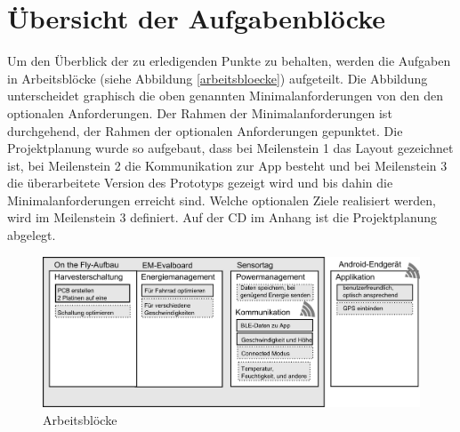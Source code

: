 \section{Übersicht der Aufgabenblöcke}

Um den Überblick der zu erledigenden Punkte zu behalten, werden die Aufgaben in Arbeitsblöcke (siehe Abbildung \ref{arbeitsbloecke}) aufgeteilt. Die Abbildung unterscheidet graphisch die oben genannten Minimalanforderungen von den den optionalen Anforderungen. Der Rahmen der Minimalanforderungen ist durchgehend, der Rahmen der optionalen Anforderungen gepunktet. Die Projektplanung wurde so aufgebaut, dass bei Meilenstein 1 das Layout gezeichnet ist, bei Meilenstein 2 die Kommunikation zur App besteht und bei Meilenstein 3 die überarbeitete Version des Prototyps gezeigt wird und bis dahin die Minimalanforderungen erreicht sind. Welche optionalen Ziele realisiert werden, wird im Meilenstein 3 definiert. Auf der CD im Anhang ist die Projektplanung abgelegt.


\begin{figure}[ht]
    \includegraphics[width=1.0\textwidth]{../ressources/Projektorganisation/Arbeitsbloecke.png} 
    \caption{Arbeitsblöcke}
\end{figure}\label{arbeitsbloecke} 

